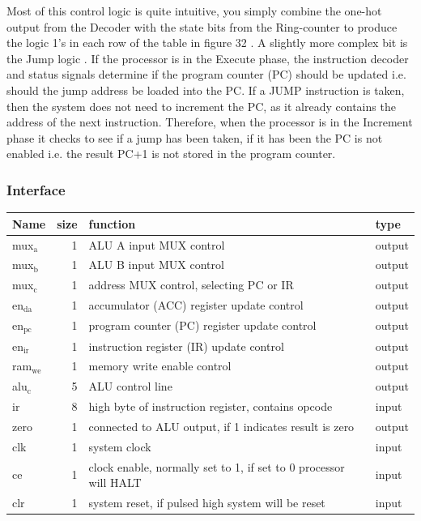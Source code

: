 \documentclass[11pt]{article}
\begin{document}
Most of this control logic is quite intuitive, you simply combine the one-hot output from the Decoder with the state bits from the Ring-counter to produce the logic 1's in each row of the table in figure 32 . A slightly more complex bit is the Jump logic . If the processor is in the Execute phase, the instruction decoder and status signals determine if the program counter (PC) should be updated i.e. should the jump address be loaded into the PC. If a JUMP instruction is taken, then the system does not need to increment the PC, as it already contains the address of the next instruction. Therefore, when the processor is in the Increment phase it checks to see if a jump has been taken, if it has been the PC is not enabled i.e. the result PC+1 is not stored in the program counter.




\subsubsection{Interface}
\label{sec:org4082eaf}
\begin{center}
\begin{tabular}{lrll}
Name & size & function & type\\
\hline
mux\(_{\text{a}}\) & 1 & ALU A input MUX control & output\\
mux\(_{\text{b}}\) & 1 & ALU B input MUX control & output\\
mux\(_{\text{c}}\) & 1 & address MUX control, selecting PC or IR & output\\
en\(_{\text{da}}\) & 1 & accumulator (ACC) register update control & output\\
en\(_{\text{pc}}\) & 1 & program counter (PC) register update control & output\\
en\(_{\text{ir}}\) & 1 & instruction register (IR) update control & output\\
ram\(_{\text{we}}\) & 1 & memory write enable control & output\\
alu\(_{\text{c}}\) & 5 & ALU control line & output\\
ir & 8 & high byte of instruction register, contains opcode & input\\
zero & 1 & connected to ALU output, if 1 indicates result is zero & output\\
clk & 1 & system clock & input\\
ce & 1 & clock enable, normally set to 1, if set to 0 processor will HALT & input\\
clr & 1 & system reset, if pulsed high system will be reset & input\\
\hline
\end{tabular}
\end{center}
\end{document}

